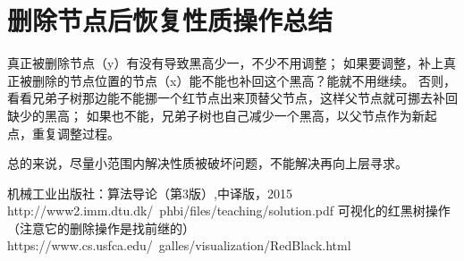 \documentclass[a4paper, 11pt]{article}
\begin{document}
\section{删除节点后恢复性质操作总结}

真正被删除节点（y）有没有导致黑高少一，不少不用调整；
如果要调整，补上真正被删除的节点位置的节点（x）能不能也补回这个黑高？能就不用继续。
否则，看看兄弟子树那边能不能挪一个红节点出来顶替父节点，这样父节点就可挪去补回缺少的黑高；
如果也不能，兄弟子树也自己减少一个黑高，以父节点作为新起点，重复调整过程。\newline

总的来说，尽量小范围内解决性质被破坏问题，不能解决再向上层寻求。

\newpage
\begin{thebibliography}{99}
机械工业出版社：算法导论（第3版）,中译版，2015
http://www2.imm.dtu.dk/~phbi/files/teaching/solution.pdf
可视化的红黑树操作（注意它的删除操作是找前继的）https://www.cs.usfca.edu/~galles/visualization/RedBlack.html
 
\end{thebibliography}
\end{document}
